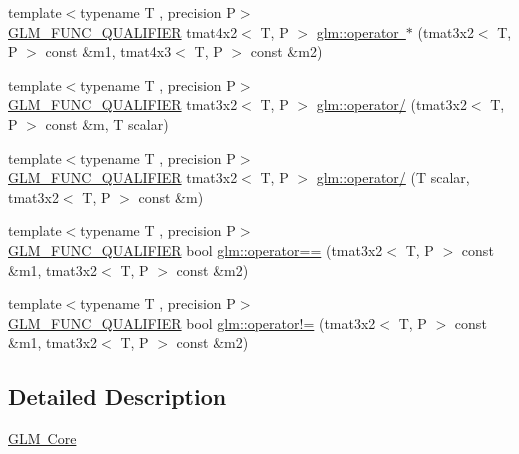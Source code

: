 \begin{DoxyCompactItemize}
\item 
{\footnotesize template$<$typename T , precision P$>$ }\\\mbox{\hyperlink{setup_8hpp_a33fdea6f91c5f834105f7415e2a64407}{G\+L\+M\+\_\+\+F\+U\+N\+C\+\_\+\+Q\+U\+A\+L\+I\+F\+I\+ER}} tmat4x2$<$ T, P $>$ \mbox{\hyperlink{namespaceglm_acc4b800d5ceef4b328c26c3b981ddead}{glm\+::operator $\ast$}} (tmat3x2$<$ T, P $>$ const \&m1, tmat4x3$<$ T, P $>$ const \&m2)
\item 
{\footnotesize template$<$typename T , precision P$>$ }\\\mbox{\hyperlink{setup_8hpp_a33fdea6f91c5f834105f7415e2a64407}{G\+L\+M\+\_\+\+F\+U\+N\+C\+\_\+\+Q\+U\+A\+L\+I\+F\+I\+ER}} tmat3x2$<$ T, P $>$ \mbox{\hyperlink{namespaceglm_a3596f2711520562c4d70fa9f5c532e77}{glm\+::operator/}} (tmat3x2$<$ T, P $>$ const \&m, T scalar)
\item 
{\footnotesize template$<$typename T , precision P$>$ }\\\mbox{\hyperlink{setup_8hpp_a33fdea6f91c5f834105f7415e2a64407}{G\+L\+M\+\_\+\+F\+U\+N\+C\+\_\+\+Q\+U\+A\+L\+I\+F\+I\+ER}} tmat3x2$<$ T, P $>$ \mbox{\hyperlink{namespaceglm_a3efe0cc5b299c1cb79ee9232a451d176}{glm\+::operator/}} (T scalar, tmat3x2$<$ T, P $>$ const \&m)
\item 
{\footnotesize template$<$typename T , precision P$>$ }\\\mbox{\hyperlink{setup_8hpp_a33fdea6f91c5f834105f7415e2a64407}{G\+L\+M\+\_\+\+F\+U\+N\+C\+\_\+\+Q\+U\+A\+L\+I\+F\+I\+ER}} bool \mbox{\hyperlink{namespaceglm_af31e44ac30f1ebf93cc4324d0cde3050}{glm\+::operator==}} (tmat3x2$<$ T, P $>$ const \&m1, tmat3x2$<$ T, P $>$ const \&m2)
\item 
{\footnotesize template$<$typename T , precision P$>$ }\\\mbox{\hyperlink{setup_8hpp_a33fdea6f91c5f834105f7415e2a64407}{G\+L\+M\+\_\+\+F\+U\+N\+C\+\_\+\+Q\+U\+A\+L\+I\+F\+I\+ER}} bool \mbox{\hyperlink{namespaceglm_ab6d7d37966e4c81709adf07b0fd9a9d0}{glm\+::operator!=}} (tmat3x2$<$ T, P $>$ const \&m1, tmat3x2$<$ T, P $>$ const \&m2)
\end{DoxyCompactItemize}


\subsection{Detailed Description}
\mbox{\hyperlink{group__core}{G\+LM Core}} 